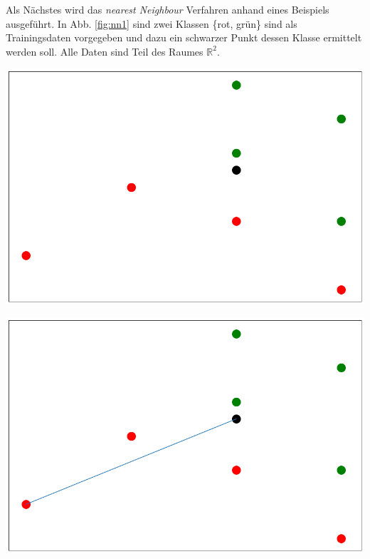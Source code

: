 \documentclass[fontsize=11pt]{scrartcl}
\newenvironment{Figure}
  {\par\medskip\noindent\minipage{\linewidth}}
  {\endminipage\par\medskip}
\begin{document}
				Als Nächstes wird das \emph{nearest Neighbour} Verfahren anhand eines Beispiels ausgeführt.
				In Abb. \ref{fig:nn1} sind zwei Klassen \{rot, grün\} sind als Trainingsdaten vorgegeben und dazu ein schwarzer Punkt dessen Klasse ermittelt werden soll. Alle Daten sind Teil des Raumes $\mathbb{R}^2$.\par
                \begin{Figure}
                    \begin{minipage}[b]{.4\linewidth}
                        \includegraphics[width=\linewidth]{nn1.png}
                        \label{fig:nn1}       
                    \end{minipage}
                    \hspace*{.1\linewidth}
                    \begin{minipage}[b]{.4\linewidth}
                        \includegraphics[width=\linewidth]{nn2.png}
                           \label{fig:nn2} 
                    \end{minipage}
                \end{Figure}
\end{document}
